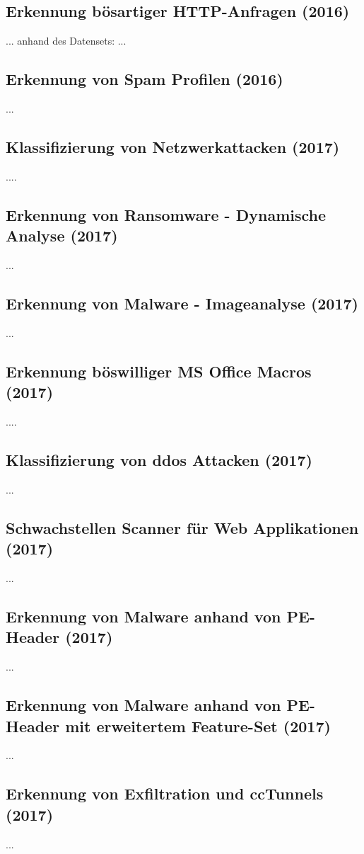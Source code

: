 \documentclass[
    12pt, %
    DIV10,
    ngerman, %
    a4paper, %
    oneside, %
    titlepage, %
    parskip=half, %
    headings=normal, %
    listof=totoc, %
    bibliography=totoc, %
    index=totoc, %
    captions=tableheading, %
    final %
]{scrreprt}
\begin{document}
\subsection{Erkennung bösartiger HTTP-Anfragen (2016)}
\textcite{Pham2016}...
anhand des Datensets: \textcite{csic}...
%
\subsection{Erkennung von Spam Profilen (2016)}
\textcite{singh2016novel}...
%
\subsection{Klassifizierung von Netzwerkattacken (2017)}
\textcite{Yin2017}....
%
\subsection{Erkennung von Ransomware - Dynamische Analyse (2017)}
\textcite{Maniath2018}...
%
\subsection{Erkennung von Malware - Imageanalyse (2017)}
\textcite{Roma2017}...

%
\subsection{Erkennung böswilliger MS Office Macros (2017)}
\textcite{Bearden2018}....
%
\subsection{Klassifizierung von \ac{ddos} Attacken (2017)}
\textcite{He2017}...
%
\subsection{Schwachstellen Scanner für Web Applikationen (2017)}
\textcite{VidyavardhakaCollegeofEngineering2017}...
%
\subsection{Erkennung von Malware anhand von PE-Header (2017)}
\textcite{Raff2017}...
%
\subsection{Erkennung von Malware anhand von PE-Header mit erweitertem  Feature-Set (2017)}
\textcite{Kumar2017}...
%
\subsection{Erkennung von Exfiltration und \ac{cc}Tunnels (2017)}
\textcite{Das2018}...
%
\end{document}
